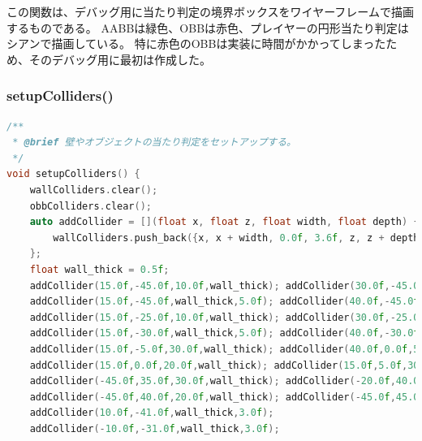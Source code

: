 \documentclass[uplatex,dvipdfmx,a4paper]{jsarticle}
\begin{document}
この関数は、デバッグ用に当たり判定の境界ボックスをワイヤーフレームで描画するものである。
AABBは緑色、OBBは赤色、プレイヤーの円形当たり判定はシアンで描画している。
特に赤色のOBBは実装に時間がかかってしまったため、そのデバッグ用に最初は作成した。

\hypertarget{func:setupColliders}{}\subsubsection{setupColliders()}\label{func:setupColliders}
\begin{lstlisting}[language=C++, caption={setupColliders() 関数}, label={lst:setupColliders_full_detail}]
/**
 * @brief 壁やオブジェクトの当たり判定をセットアップする。
 */
void setupColliders() {
    wallColliders.clear();
    obbColliders.clear();
    auto addCollider = [](float x, float z, float width, float depth) {
        wallColliders.push_back({x, x + width, 0.0f, 3.6f, z, z + depth});
    };
    float wall_thick = 0.5f;
    addCollider(15.0f,-45.0f,10.0f,wall_thick); addCollider(30.0f,-45.0f,10.0f,wall_thick);
    addCollider(15.0f,-45.0f,wall_thick,5.0f); addCollider(40.0f,-45.0f,wall_thick,5.0f);
    addCollider(15.0f,-25.0f,10.0f,wall_thick); addCollider(30.0f,-25.0f,10.0f,wall_thick);
    addCollider(15.0f,-30.0f,wall_thick,5.0f); addCollider(40.0f,-30.0f,wall_thick,5.0f);
    addCollider(15.0f,-5.0f,30.0f,wall_thick); addCollider(40.0f,0.0f,5.0f,wall_thick);
    addCollider(15.0f,0.0f,20.0f,wall_thick); addCollider(15.0f,5.0f,30.0f,wall_thick);
    addCollider(-45.0f,35.0f,30.0f,wall_thick); addCollider(-20.0f,40.0f,5.0f,wall_thick);
    addCollider(-45.0f,40.0f,20.0f,wall_thick); addCollider(-45.0f,45.0f,30.0f,wall_thick);
    addCollider(10.0f,-41.0f,wall_thick,3.0f); 
    addCollider(-10.0f,-31.0f,wall_thick,3.0f); 


\end{lstlisting}
\end{document}
